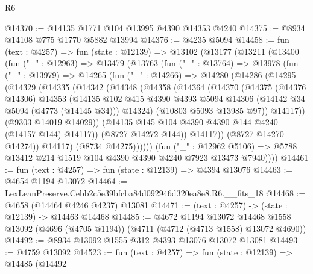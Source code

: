 \begin{lexlean}{R6}
\begin{coremodule}
@14370 := @14135 @1771 @104 @13995 @4390 @14353 @4240
@14375 := @8934 @14108 @775 @1770 @5882 @13994
@14376 := @4235 @5094
@14458 := fun (text : @4257) =>
  fun (state : @12139) =>
  @13102
    (@13177
      (@13211
        (@13400
          (fun ("_" : @12963) =>
          @13479
            (@13763
              (fun ("_" : @13764) =>
              @13978
                (fun ("_" : @13979) =>
                @14265
                  (fun ("_" : @14266) =>
                  @14280
                    (@14286
                      (@14295
                        (@14329
                          (@14335
                            (@14342
                              (@14348
                                (@14358
                                  (@14364
                                    (@14370
                                      (@14375
                                        (@14376 @14306)
                                        @14353
                                        (@14135
                                          @102
                                          @415
                                          @4390
                                          @4393
                                          @5094
                                          @14306
                                          (@14142 @34 @5094 (@4773 (@14145 @34)))
                                          @14324)
                                        (@10803 @5093 @13985 @97))
                                      @14117))
                                  (@9303 @14019 @14029))
                                (@14135 @145 @104 @4390 @4390 @144 @4240 (@14157 @144) @14117))
                              (@8727 @14272 @144))
                            @14117))
                        (@8727 @14270 @14274))
                      @14117)
                    (@8734 @14275))))))
          (fun ("_" : @12962 @5106) =>
          @5788 @13412 @214 @1519 @104 @4390 @4390 @4240 @7923 @13473 @7940))))
@14461 := fun (text : @4257) => fun (state : @12139) => @4394 @13076
@14463 := @4654 @1194 @13072
@14464 := LexLeanPreserve.Cebb2c5e39bfcba84d092946d320ea8e8.R6.__fits_18
@14468 := @4658 (@14464 @4246 @4237) @13081
@14471 := (text : @4257) -> (state : @12139) -> @14463 @14468
@14485 := @4672
    @1194
    @13072
    @14468
    @1558
    @13092
    (@4696 (@4705 @1194))
    (@4711 (@4712 (@4713 @1558) @13072 @4690))
@14492 := @8934 @13092 @1555 @312 @4393 @13076 @13072 @13081
@14493 := @4759 @13092
@14523 := fun (text : @4257) =>
  fun (state : @12139) =>
  @14485
    (@14492

\end{coremodule}
\end{lexlean}

